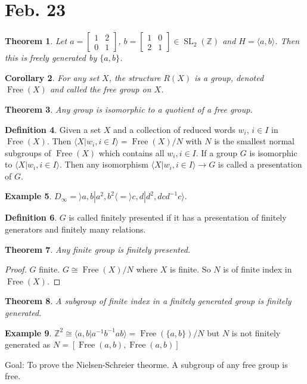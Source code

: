 \documentclass{amsart}
\newtheorem{thm}{Theorem}[section]
\newtheorem{cor}[thm]{Corollary}
\theoremstyle{definition}
\newtheorem{definition}[thm]{Definition}
\newtheorem{example}[thm]{Example}
\newcommand{\Z}{\mathbb Z}
\DeclareMathOperator{\SL}{SL}
\DeclareMathOperator{\Free}{Free}
\begin{document}
\section{Feb. 23}
\begin{thm}
	Let $a=\begin{bmatrix}
		1&2\\0&1
	\end{bmatrix}$, $b=\begin{bmatrix}
		1&0\\2&1
	\end{bmatrix}\in \SL_2(\Z)$ and $H=\langle a,b\rangle$. Then this is freely generated by $\{a,b\}$.
\end{thm}
\begin{cor}
For any set $X$, the structure $R(X)$ is a group, denoted $\Free(X)$ and called the free group on $X$.	
\end{cor}
\begin{thm}
	Any group is isomorphic to a quotient of a free group.
\end{thm}
\begin{definition}
	Given a set $X$ and a collection of reduced words $w_i$, $i\in I$ in $\Free(X)$. Then $\langle X| w_i,i\in I\rangle =\Free(X)/N$ with $N$ is the smallest normal subgroups of $\Free(X)$ which contains all $w_i,i\in I$. If a group $G$ is isomorphic to $\langle X|w_i,i\in I\rangle$. Then any isomorphism $\langle X|w_i,i\in I\rangle\to G$ is called a presentation of $G$.
\end{definition}
\begin{example}
	$D_\infty=\rangle a,b|a^{2},b^2\langle=\rangle c,d|d^2,dcd^{-1}c\rangle$.
\end{example}
\begin{definition}
	$G$ is called finitely presented if it has a presentation of finitely generators and finitely many relations.
\end{definition}
\begin{thm}
	Any finite group is finitely presented.
\end{thm}
\begin{proof}
	$G$ finite. $G\cong \Free(X)/N$ where $X$ is finite. So $N$ is of finite index in $\Free(X)$.
\end{proof}
\begin{thm}
	A subgroup of finite index in a finitely generated group is finitely generated. 
\end{thm}
\begin{example}
	$\Z^2\cong\langle a,b|a^{-1}b^{-1}ab\rangle =\Free(\{a,b\})/N$ but $N$ is not finitely generated as $N=[\Free(a,b),\Free(a,b)]$
 \end{example}
Goal: To prove the Nielsen-Schreier theorme. A subgroup of any free group is free.
\end{document}
